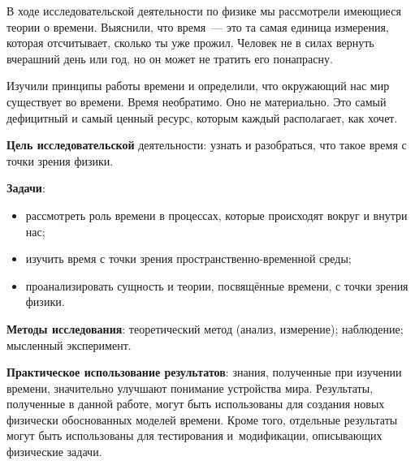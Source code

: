 \bigskip
{}



\makeProcTitleSchool


В ходе исследовательской деятельности по физике мы рассмотрели имеющиеся теории о времени. Выяснили, что время~--- это та самая единица измерения, которая отсчитывает, сколько ты уже прожил. Человек не в силах вернуть вчерашний день или год, но он может не тратить его понапрасну.

Изучили принципы работы времени и определили, что окружающий нас мир существует во времени. Время необратимо. Оно не материально. Это самый дефицитный и самый ценный ресурс, которым каждый располагает, как хочет.

\textbf{Цель исследовательской} деятельности: узнать и разобраться, что такое время с точки зрения физики.

\textbf{Задачи}:
\begin{itemize}[noitemsep]\vspace{-6pt}
\item рассмотреть роль времени в процессах, которые происходят вокруг и внутри нас;
\item изучить время с точки зрения пространственно-временной среды;
\item проанализировать сущность и теории, посвящённые времени, с точки зрения физики.
\end{itemize}\vspace{-6pt}

\textbf{Методы исследования}: теоретический метод (анализ, измерение); наблюдение; мысленный эксперимент.

\textbf{Практическое использование результатов}: знания, полученные при изучении времени, значительно улучшают понимание устройства мира. Результаты, полученные в данной работе, могут быть использованы для создания новых физически обоснованных моделей времени. Кроме того, отдельные результаты могут быть использованы для тестирования и~модификации, описывающих физические задачи.

